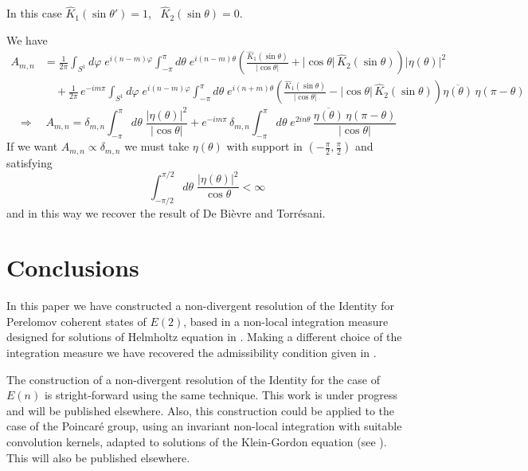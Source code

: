 \documentclass[11pt]{article}
\newcommand{\conj}[1]{\overline{#1}}
\begin{document}
In this case $\hat K_1(\sin\theta')=1$, \ $\hat K_2(\sin\theta)=0$.

We have
\begin{align*}
  A_{m,n}&=\frac{1}{2\pi}\int_{S^1}d\varphi\;e^{i(n-m)\varphi}
    \int_{-\pi}^{\pi}d\theta\;e^{i(n-m)\theta}
    \left(\frac{\hat K_1(\sin\theta)}{|\cos\theta|}+|\cos\theta|\,\hat K_2(\sin\theta)\right)
    |\eta(\theta)|^2\\
  &\quad+\frac{1}{2\pi}\,e^{-im\pi}\int_{S^1}d\varphi\;e^{i(n-m)\varphi}
    \int_{-\pi}^{\pi}d\theta\;e^{i(n+m)\theta}
    \left(\frac{\hat K_1(\sin\theta)}{|\cos\theta|}-|\cos\theta|\,\hat K_2(\sin\theta)\right)
    \conj{\eta(\theta)}\,\eta(\pi-\theta)
\end{align*}
\[
  \Rightarrow\quad A_{m,n}=\delta_{m,n}\int_{-\pi}^{\pi}d\theta\;
  \frac{|\eta(\theta)|^2}{|\cos\theta|}
  +e^{-im\pi}\,\delta_{m,n}\int_{-\pi}^{\pi}d\theta\;e^{2in\theta}\,
  \frac{\conj{\eta(\theta)}\,\eta(\pi-\theta)}{|\cos\theta|}
\]
If we want $A_{m,n}\propto\delta_{m,n}$ we must take $\eta(\theta)$ with
support in $(-\frac{\pi}{2},\frac{\pi}{2})$ and satisfying
\[
  \int_{-\pi/2}^{\pi/2}d\theta\;\frac{|\eta(\theta)|^2}{\cos\theta}<\infty
\]
and in this way we recover the result of De Bi\`evre and Torr\'esani.



\section{Conclusions}

In this paper we have constructed a non-divergent resolution of the Identity for Perelomov coherent states of $E(2)$,  based in a non-local integration measure designed for solutions of Helmholtz equation in \cite{Wolf81}. Making a different choice of the integration measure we have recovered the admissibility condition given in \cite{DeBievre89}.

The construction of a non-divergent resolution of the Identity for the case of $E(n)$ is stright-forward using the same technique. This work is under progress and will be published elsewhere. Also, this construction could be applied to the case of the Poincar\'e group, using an invariant non-local integration with suitable convolution kernels, adapted to solutions of the Klein-Gordon equation (see \cite{LopezRuiz20,LopezRuiz21}). This will also be published elsewhere.
\end{document}
